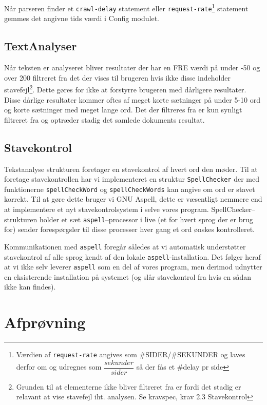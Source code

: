 \documentclass[a4paper,oneside]{memoir}
\begin{document}
Når parseren finder et \texttt{crawl-delay} statement eller 
\texttt{request-rate}\footnote{Værdien af \texttt{request-rate}
angives som \#SIDER/\#SEKUNDER og laves derfor om og udregnes som
$\dfrac{sekunder}{sider}$ så der fås et \#delay pr side} statement
gemmes det angivne tids værdi i Config modulet.

\section{TextAnalyser}
\label{TextAnalyser}

Når teksten er analyseret bliver resultater der har en FRE værdi på under -50
og over 200 filtreret fra det der vises til brugeren hvis ikke disse indeholder
stavefejl\footnote{Grunden til at elementerne ikke bliver filtreret fra er
fordi det stadig er relavant at vise stavefejl iht. analysen. Se kravspec, krav
2.3 Stavekontrol}. Dette gøres for ikke at forstyrre brugeren med dårligere
resultater. Disse dårlige resultater kommer oftes af meget korte sætninger på
 under 5-10 ord og korte sætninger med meget lange ord. Det der filtreres fra er
kun synligt filtreret fra og optræder stadig det samlede dokuments resultat.

\section{Stavekontrol}
\label{Spellchecker}

Tekstanalyse strukturen foretager en stavekontrol af hvert ord den
møder. Til at foretage stavekontrollen har vi implementeret en
struktur \texttt{SpellChecker} der med funktionerne
\texttt{spellCheckWord} og \texttt{spellCheckWords} kan angive om ord
er stavet korrekt. Til at gøre dette bruger vi GNU Aspell, dette er
væsentligt nemmere end at implementere et nyt stavekontrolsystem i selve
vores program. SpellChecker--strukturen holder et sæt
\texttt{aspell}--processor i live (et for hvert sprog der er brug for)
sender forespørgsler til disse processer hver gang et ord ønskes
kontrolleret.

Kommunikationen med \texttt{aspell} foregår således at
vi automatisk understøtter stavekontrol af alle sprog kendt af den
lokale \texttt{aspell}-installation. Det følger heraf at vi ikke selv
leverer \texttt{aspell} som en del af vores program, men derimod
udnytter en eksisterende installation på systemet (og slår
stavekontrol fra hvis en sådan ikke kan findes).

\chapter{Afprøvning}
\end{document}
